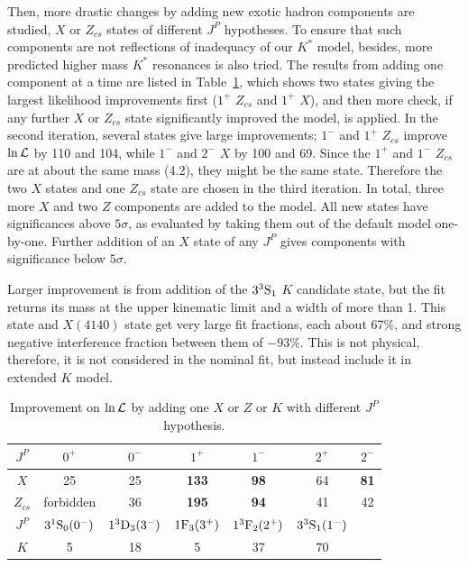 Then, more drastic changes by adding new exotic hadron components are studied, 
$X$ or $Z_{cs}$ states of different $J^P$ hypotheses.
To ensure that such components are not reflections of inadequacy of our $K^*$ model, 
besides, 
more predicted higher mass $K^*$ resonances is also tried. 
The results from adding one component at a time are listed in Table~\ref{tab:imp},
which shows two states giving the largest likelihood improvements first ($1^+$ $Z_{cs}$ and $1^+$ $X$), 
and then more check,
if any further $X$ or $Z_{cs}$ state significantly improved the model, 
is applied.
In the second iteration, 
several states give large improvements; $1^-$ and $1^+$ $Z_{cs}$ improve $\ln\mathcal{L}$ by 110 and 104, 
while $1^-$ and $2^-$ $X$ by 100 and 69. 
Since the $1^+$ and $1^-$ $Z_{cs}$ are at about the same mass (4.2\gev), 
they might be the same state. 
Therefore the two $X$ states and one $Z_{cs}$ state are chosen in the third iteration. 
In total, 
three more $X$ and two $Z$ components are added to the model. 
All new states have significances above $5\sigma$, as evaluated by taking them out of the default model one-by-one. 
Further addition of an $X$ state of any $J^P$ gives components with significance below $5\sigma$.


Larger improvement is from addition of the $3{}^{3}{\rm S}_{1}$ $K$ candidate state, 
but the fit returns its mass at the upper kinematic limit and a width of more than 1\gev. 
This state and $X(4140)$ state get very large fit fractions, each about 67\%, and strong negative interference fraction between them of $-93\%$.  
This is not physical, 
therefore, 
it is not considered in the nominal fit, 
but instead include it in extended $K$ model.  


\begin{table}[!hbtp]
\centering
\caption{Improvement on $\ln\mathcal{L}$ by adding one $X$ or $Z$ or $K$ with different $J^P$ hypothesis.}\label{tab:imp}
\begin{tabular}{ccccccc}\hline
$J^P$&$0^+$& $0^-$&$1^+$&$1^-$&$2^+$&$2^-$\\\hline
$X$&25&25&\bf133&\bf 98&64& \bf 81\\
$Z_{cs}$&forbidden&36&\bf195&\bf94&41&42\\
\hline\hline
$J^P$&$3{}^{1}{\rm S}_{0}(0^-)$& $1{}^{3}{\rm D}_{3}(3^-)$&$1{\rm F}_{3}(3^+)$&$1{}^{3}{\rm F}_{2}(2^+)$&$3{}^{3}{\rm S}_{1}(1^-)$\\\hline
$K$&5&18&5&37&70\\
\hline
\end{tabular}
\end{table}


